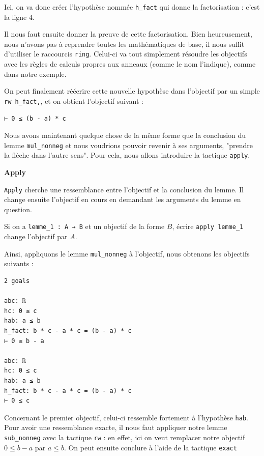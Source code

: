 \documentclass[a4paper, 11pt, twoside]{report}
\begin{document}
Ici, on va donc créer l'hypothèse nommée \verb|h_fact| qui donne la factorisation : c'est la ligne 4.

Il nous faut ensuite donner la preuve de cette factorisation. Bien heureusement, nous n'avons pas à reprendre toutes les mathématiques de base, il nous suffit d'utiliser le raccourcis \verb|ring|. Celui-ci va tout simplement résoudre les objectifs avec les règles de calculs propres aux anneaux (comme le nom l'indique), comme dans notre exemple. 

On peut finalement réécrire cette nouvelle hypothèse dans l'objectif par un simple \verb|rw h_fact,|, et on obtient l'objectif suivant :

\begin{lstlisting}
⊢ 0 ≤ (b - a) * c
\end{lstlisting}

Nous avons maintenant quelque chose de la même forme que la conclusion du lemme \verb|mul_nonneg| et nous voudrions pouvoir revenir à ses arguments, "prendre la flèche dans l'autre sens". Pour cela, nous allons introduire la tactique \verb|apply|.

\begin{tactic}
	\centerline{\bfseries Apply}
	
	\verb|Apply| cherche une ressemblance entre l'objectif et la conclusion du lemme. Il change ensuite l'objectif en cours en demandant les arguments du lemme en question.
	
	\tcblower
	Si on a \verb|lemme_1 : A → B| et un objectif de la forme $B$,
	écrire \verb|apply lemme_1| change l'objectif par $A$.
\end{tactic}

Ainsi, appliquons le lemme \verb|mul_nonneg| à l'objectif, nous obtenons les objectifs suivants :

\begin{lstlisting}
2 goals

abc: ℝ
hc: 0 ≤ c
hab: a ≤ b
h_fact: b * c - a * c = (b - a) * c
⊢ 0 ≤ b - a

abc: ℝ
hc: 0 ≤ c
hab: a ≤ b
h_fact: b * c - a * c = (b - a) * c
⊢ 0 ≤ c
\end{lstlisting}

Concernant le premier objectif, celui-ci ressemble fortement à l'hypothèse \verb|hab|. Pour avoir une ressemblance exacte, il nous faut appliquer notre lemme \verb|sub_nonneg| avec la tactique \verb|rw| : en effet, ici on veut remplacer notre objectif $0\leq b-a$ par $a\leq b$. On peut ensuite conclure à l'aide de la tactique \verb|exact|
\end{document}
